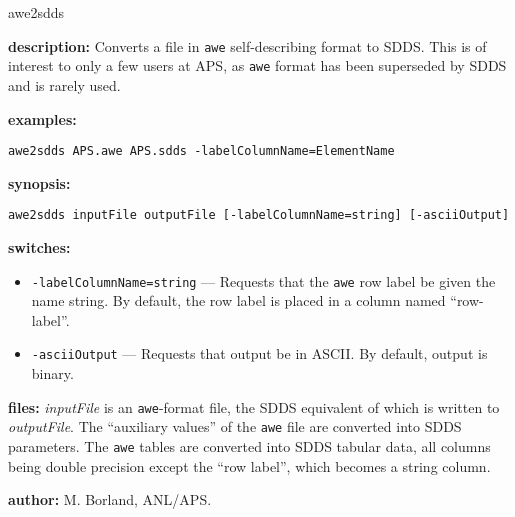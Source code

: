 \begin{sddsprog}{awe2sdds}
  \item \textbf{description:} Converts a file in \verb|awe| self-describing format to SDDS. This is of interest to only a few users at APS, as \verb|awe| format has been superseded by SDDS and is rarely used.
  \item \textbf{examples:}
    \begin{verbatim}
awe2sdds APS.awe APS.sdds -labelColumnName=ElementName
    \end{verbatim}
  \item \textbf{synopsis:}
    \begin{verbatim}
awe2sdds inputFile outputFile [-labelColumnName=string] [-asciiOutput]
    \end{verbatim}
  \item \textbf{switches:}
    \begin{itemize}
      \item \verb|-labelColumnName=string| --- Requests that the \verb|awe| row label be given the name string. By default, the row label is placed in a column named ``row-label''.
      \item \verb|-asciiOutput| --- Requests that output be in ASCII. By default, output is binary.
    \end{itemize}
  \item \textbf{files:} \emph{inputFile} is an \verb|awe|-format file, the SDDS equivalent of which is written to \emph{outputFile}. The ``auxiliary values'' of the \verb|awe| file are converted into SDDS parameters. The \verb|awe| tables are converted into SDDS tabular data, all columns being double precision except the ``row label'', which becomes a string column.
  \item \textbf{author:} M. Borland, ANL/APS.
\end{sddsprog}

